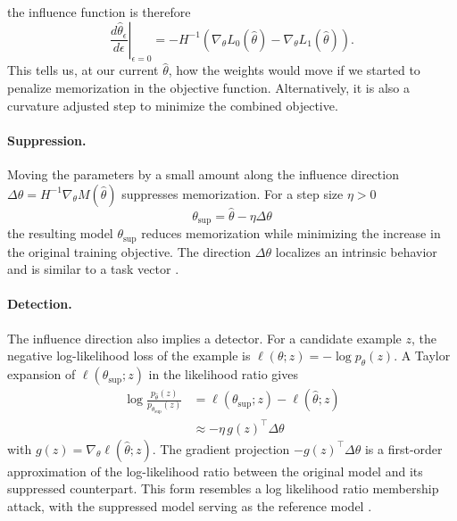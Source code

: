 \documentclass{article}
\begin{document}
the influence function is therefore
\begin{equation}
    \boxed{
    \left.
    \frac{d\hat{\theta}_\epsilon}{d\epsilon}
    \right|_{\epsilon=0}
    =
    -H^{-1}
    \left(
        \nabla_\theta L_0(\hat{\theta})
        -
        \nabla_\theta L_1(\hat{\theta})
    \right)
    }.
    \label{eq:memorization-influence}
\end{equation}
This tells us, at our current $\hat{\theta}$, how the weights would move if we started to penalize memorization in the objective function. Alternatively, it is also a curvature adjusted step to minimize the combined objective.

\paragraph{Suppression.} Moving the parameters by a small amount along the influence direction $\Delta\theta = H^{-1}\nabla_\theta M(\hat{\theta})$ suppresses memorization. For a step size \(\eta>0\)
\begin{equation}
    \theta_{\mathrm{sup}}
    =
    \hat{\theta}
    -
    \eta \Delta\theta
    \label{eq:memorization-suppression}
\end{equation}
the resulting model \(\theta_{\mathrm{sup}}\) reduces memorization while minimizing the increase in the original training objective. The direction $\Delta\theta$ localizes an intrinsic behavior and is similar to a task vector \cite{ilharco2023editing}.

\paragraph{Detection.} The influence direction also implies a detector. For a
candidate example \(z\), the negative log-likelihood loss of the example is \(\ell(\theta;z)=-\log p_\theta(z)\). A Taylor expansion of \(\ell(\theta_{\mathrm{sup}};z)\) in the likelihood ratio gives
\begin{equation}
    \begin{aligned}
        \log\frac{p_{\hat{\theta}}(z)}
                  {p_{\theta_{\mathrm{sup}}}(z)}
        &=
        \ell(\theta_{\mathrm{sup}};z)
        -
        \ell(\hat{\theta};z) \\
        &\approx
        -\eta\,g(z)^\top\Delta\theta
    \end{aligned}
\end{equation}
with \(g(z)=\nabla_\theta\ell(\hat{\theta};z)\). The gradient projection $-g(z)^\top\Delta\theta$ is a first-order approximation of the log-likelihood ratio between the original model and its suppressed counterpart. This form resembles a log likelihood ratio membership attack, with the suppressed model serving as the reference model \cite{pmlr-v97-sablayrolles19a}. 
\end{document}
